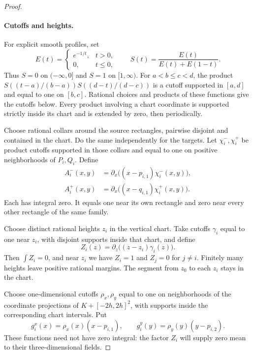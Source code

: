 \documentclass[11pt]{article}
\theoremstyle{remark}
\begin{document}
\begin{proof}
\paragraph{Cutoffs and heights.}
For explicit smooth profiles, set
\[
 E(t)=\begin{cases}e^{-1/t},&t>0,\\0,&t\le0,\end{cases}
 \qquad S(t)=\frac{E(t)}{E(t)+E(1-t)}.
\]
Thus $S=0$ on $(-\infty,0]$ and $S=1$ on $[1,\infty)$.
For $a<b\le c<d$, the product
$S((t-a)/(b-a))S((d-t)/(d-c))$ is a cutoff supported in $[a,d]$
and equal to one on $[b,c]$. Rational choices and products of these
functions give the cutoffs below. Every product involving a chart
coordinate is supported strictly inside its chart and is extended by
zero, then periodically.

Choose rational collars around the source rectangles, pairwise disjoint
and contained in the chart. Do the same independently for the targets.
Let $\chi_i^-,\chi_i^+$ be product cutoffs supported in those collars
and equal to one on positive neighborhoods of $P_i,Q_i$. Define
\begin{equation}\label{eq:A}
 \begin{split}
 A_i^-(x,y)&=\partial_x\bigl((x-p_{i,1})\chi_i^-(x,y)\bigr),\\
 A_i^+(x,y)&=\partial_x\bigl((x-q_{i,1})\chi_i^+(x,y)\bigr).
 \end{split}
\end{equation}
Each has integral zero. It equals one near its own rectangle and zero
near every other rectangle of the same family.

Choose distinct rational heights $z_i$ in the vertical chart. Take
cutoffs $\gamma_i$ equal to one near $z_i$, with disjoint supports inside
that chart, and define
\begin{equation}\label{eq:Z}
 Z_i(z)=\partial_z\bigl((z-z_i)\gamma_i(z)\bigr).
\end{equation}
Then $\int Z_i=0$, and near $z_i$ we have $Z_i=1$ and $Z_j=0$ for
$j\ne i$. Finitely many heights leave positive rational margins. The
segment from $z_0$ to each $z_i$ stays in the chart.

Choose one-dimensional cutoffs $\rho_x,\rho_y$ equal to one on
neighborhoods of the coordinate projections of $K+[-2h,2h]^2$, with
supports inside the corresponding chart intervals. Put
\[
 g_i^x(x)=\rho_x(x)(x-p_{i,1}),\qquad
 g_i^y(y)=\rho_y(y)(y-p_{i,2}).
\]
These functions need not have zero integral: the factor $Z_i$ will supply
zero mean to their three-dimensional fields.


\end{proof}
\end{document}
